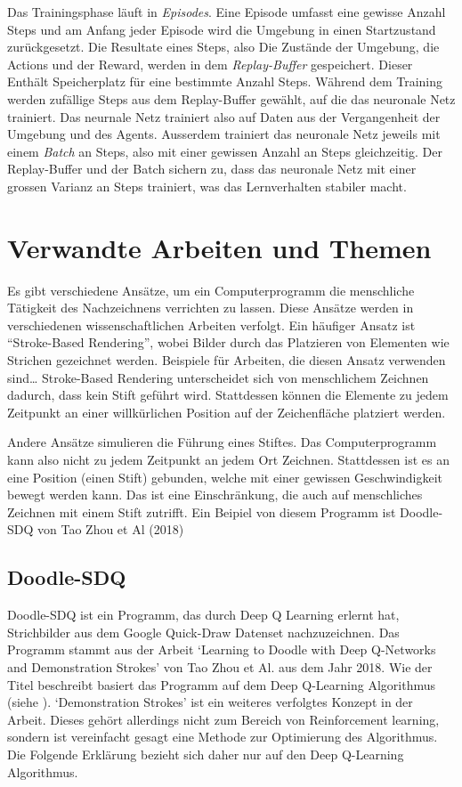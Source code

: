 Das Trainingsphase läuft in \emph{Episodes}. Eine Episode umfasst eine gewisse
Anzahl Steps und am Anfang jeder Episode wird die Umgebung in einen Startzustand
zurückgesetzt. Die Resultate eines Steps, also Die Zustände der Umgebung, die
Actions und der Reward, werden in dem \emph{Replay-Buffer} gespeichert. Dieser
Enthält Speicherplatz für eine bestimmte Anzahl Steps. Während dem Training
werden zufällige Steps aus dem Replay-Buffer gewählt, auf die das neuronale Netz
trainiert. Das neurnale Netz trainiert also auf Daten aus der Vergangenheit
der Umgebung und des Agents. Ausserdem trainiert das neuronale Netz jeweils mit
einem \emph{Batch} an Steps, also mit einer gewissen Anzahl an Steps
gleichzeitig. Der Replay-Buffer und der Batch sichern zu, dass das neuronale
Netz mit einer grossen Varianz an Steps trainiert, was das Lernverhalten
stabiler macht.



\section{Verwandte Arbeiten und Themen}
\label{chap:t_verwandt}
Es gibt verschiedene Ansätze, um ein Computerprogramm die menschliche Tätigkeit
des Nachzeichnens verrichten zu lassen. Diese Ansätze werden in verschiedenen
wissenschaftlichen Arbeiten verfolgt. Ein häufiger Ansatz ist ``Stroke-Based
Rendering'', wobei Bilder durch das Platzieren von Elementen wie Strichen
gezeichnet werden. Beispiele für Arbeiten, die diesen Ansatz verwenden sind\dots %
Stroke-Based Rendering unterscheidet sich von menschlichem Zeichnen dadurch,
dass kein Stift geführt wird. Stattdessen können die Elemente zu jedem Zeitpunkt
an einer willkürlichen Position auf der Zeichenfläche platziert werden.

Andere Ansätze simulieren die Führung eines Stiftes. Das Computerprogramm kann
also nicht zu jedem Zeitpunkt an jedem Ort Zeichnen. Stattdessen ist es an eine
Position (einen Stift) gebunden, welche mit einer gewissen Geschwindigkeit
bewegt werden kann. Das ist eine Einschränkung, die auch auf menschliches
Zeichnen mit einem Stift zutrifft. Ein Beipiel von diesem Programm ist Doodle-SDQ von Tao Zhou et Al (2018)

\subsection*{Doodle-SDQ}
Doodle-SDQ ist ein Programm, das durch Deep Q Learning erlernt hat, Strichbilder
aus dem Google Quick-Draw Datenset nachzuzeichnen. Das Programm stammt aus der
Arbeit `Learning to Doodle with Deep Q-Networks and Demonstration Strokes' von
Tao Zhou et Al. aus dem Jahr 2018. Wie der Titel beschreibt basiert das Programm
auf dem Deep Q-Learning Algorithmus (siehe ). `Demonstration
Strokes' ist ein weiteres verfolgtes Konzept in der Arbeit. Dieses gehört
allerdings nicht zum Bereich von Reinforcement learning, sondern ist vereinfacht
gesagt eine Methode zur Optimierung des Algorithmus. Die Folgende Erklärung
bezieht sich daher nur auf den Deep Q-Learning Algorithmus.

